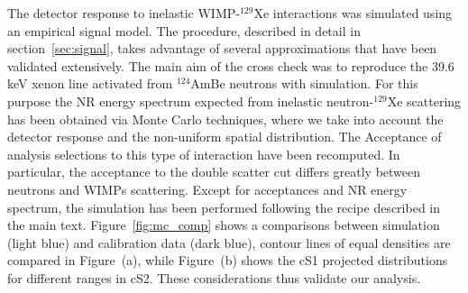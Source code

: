 The detector response to inelastic WIMP-$^{129}$Xe interactions was simulated using an empirical signal model. 
The procedure, described in detail in section~\ref{sec:signal}, takes advantage of several 
approximations that have been validated extensively. 
The main aim of the cross check was to reproduce the 39.6\,keV xenon line activated from $^{124}$AmBe neutrons with simulation.
For this purpose the NR energy spectrum expected from inelastic neutron-$^{129}$Xe scattering has been obtained via  Monte Carlo techniques, 
where we take into account the  detector response and the non-uniform spatial distribution. The Acceptance of analysis selections to this type of interaction 
have been recomputed. In particular, the acceptance to the double scatter cut differs greatly between neutrons and WIMPs scattering. 
Except for acceptances and NR energy spectrum, the simulation has been performed following the recipe described in the main text. Figure~\ref{fig:mc_comp}
shows a comparisons between simulation (light blue) and calibration data (dark blue), contour lines of equal densities are compared in Figure~(a), 
while Figure~(b) shows the cS1 projected distributions for different ranges in cS2. These considerations thus validate our analysis.

\newpage


